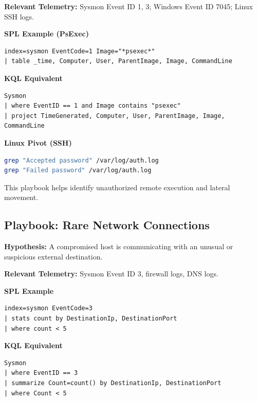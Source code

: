 \textbf{Relevant Telemetry:}  
Sysmon Event ID 1, 3; Windows Event ID 7045; Linux SSH logs.

\textbf{SPL Example (PsExec)}

\begin{lstlisting}
index=sysmon EventCode=1 Image="*psexec*"
| table _time, Computer, User, ParentImage, Image, CommandLine
\end{lstlisting}

\textbf{KQL Equivalent}

\begin{lstlisting}
Sysmon
| where EventID == 1 and Image contains "psexec"
| project TimeGenerated, Computer, User, ParentImage, Image, CommandLine
\end{lstlisting}

\textbf{Linux Pivot (SSH)}

\begin{lstlisting}[language=bash]
grep "Accepted password" /var/log/auth.log
grep "Failed password" /var/log/auth.log
\end{lstlisting}

This playbook helps identify unauthorized remote execution and lateral movement.


\subsection*{Playbook: Rare Network Connections}

\textbf{Hypothesis:}  
A compromised host is communicating with an unusual or suspicious external destination.

\textbf{Relevant Telemetry:}  
Sysmon Event ID 3, firewall logs, DNS logs.

\textbf{SPL Example}

\begin{lstlisting}
index=sysmon EventCode=3
| stats count by DestinationIp, DestinationPort
| where count < 5
\end{lstlisting}

\textbf{KQL Equivalent}

\begin{lstlisting}
Sysmon
| where EventID == 3
| summarize Count=count() by DestinationIp, DestinationPort
| where Count < 5
\end{lstlisting}


